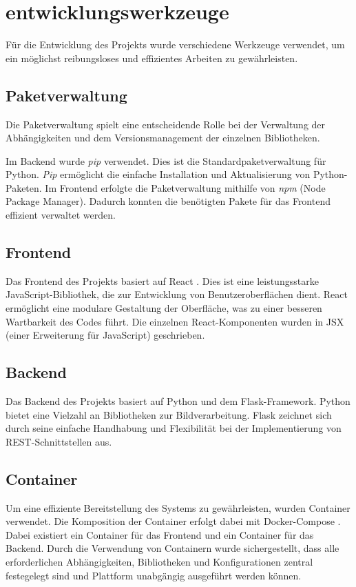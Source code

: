 \section{entwicklungswerkzeuge}
Für die Entwicklung des Projekts wurde verschiedene Werkzeuge verwendet, um ein möglichst reibungsloses und effizientes Arbeiten zu gewährleisten.

\subsection{Paketverwaltung}
Die Paketverwaltung spielt eine entscheidende Rolle bei der Verwaltung der Abhängigkeiten und dem Versionsmanagement der einzelnen Bibliotheken.

Im Backend wurde \textit{pip} verwendet. Dies ist die Standardpaketverwaltung für Python. \textit{Pip} ermöglicht die einfache Installation und Aktualisierung von Python-Paketen. Im Frontend erfolgte die Paketverwaltung mithilfe von  \textit{npm} (Node Package Manager). Dadurch konnten die benötigten Pakete für das Frontend effizient verwaltet werden.

\subsection{Frontend}
Das Frontend des Projekts basiert auf React \cite{react}. Dies ist eine leistungsstarke JavaScript-Bibliothek, die zur Entwicklung von Benutzeroberflächen dient. React ermöglicht eine modulare Gestaltung der Oberfläche, was zu einer besseren Wartbarkeit des Codes führt. Die einzelnen React-Komponenten wurden in JSX (einer Erweiterung für JavaScript) geschrieben. 

\subsection{Backend}
Das Backend des Projekts basiert auf Python und dem Flask-Framework. Python bietet eine Vielzahl an Bibliotheken zur Bildverarbeitung. Flask zeichnet sich durch seine einfache Handhabung und Flexibilität bei der Implementierung von REST-Schnittstellen aus.

\subsection{Container}
Um eine effiziente Bereitstellung des Systems zu gewährleisten, wurden Container verwendet. Die Komposition der Container erfolgt dabei mit Docker-Compose \cite{docker_compose}. Dabei existiert ein Container für das Frontend und ein Container für das Backend. Durch die Verwendung von Containern wurde sichergestellt, dass alle erforderlichen Abhängigkeiten, Bibliotheken und Konfigurationen zentral festegelegt sind und Plattform unabgängig ausgeführt werden können.